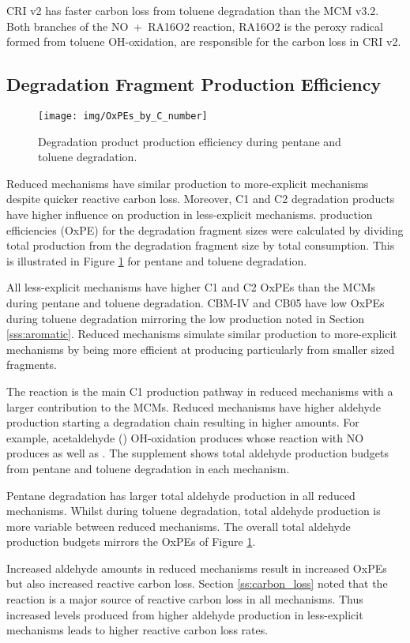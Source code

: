 CRI v2 has faster carbon loss from toluene degradation than the MCM v3.2.
Both branches of the \mbox{NO + RA16O2} reaction, RA16O2 is the peroxy radical formed from toluene OH-oxidation, are responsible for the carbon loss in CRI v2.

\subsection[Degradation Fragment Ox Production Efficiency]{Degradation Fragment  Production Efficiency} \label{ss:OxPE}

\begin{figure}
    \centering
    \texttt{[image: img/OxPEs\_by\_C\_number]}
    \vspace{0mm}
    \caption{Degradation product  production efficiency during pentane and toluene degradation.}
    \vspace{-4mm}
    \label{f:OxPE}
\end{figure}

Reduced mechanisms have similar  production to more-explicit mechanisms despite quicker reactive carbon loss.
Moreover, C1 and C2 degradation products have higher influence on  production in less-explicit mechanisms.
 production efficiencies (OxPE) for the degradation fragment sizes were calculated by dividing total  production from the degradation fragment size by total  consumption.
This is illustrated in Figure \ref{f:OxPE} for pentane and toluene degradation.

All less-explicit mechanisms have higher C1 and C2 OxPEs than the MCMs during pentane and toluene degradation.
CBM-IV and CB05 have low OxPEs during toluene degradation mirroring the low  production noted in Section \ref{sss:aromatic}.
Reduced mechanisms simulate similar  production to more-explicit mechanisms by being more efficient at producing  particularly from smaller sized fragments.

The  reaction is the main C1  production pathway in reduced mechanisms with a larger contribution to the MCMs.
Reduced mechanisms have higher aldehyde production starting a degradation chain resulting in higher  amounts.
For example, acetaldehyde () OH-oxidation produces  whose reaction with NO produces  as well as .
The supplement shows total aldehyde production budgets from pentane and toluene degradation in each mechanism.  

Pentane degradation has larger total aldehyde production in all reduced mechanisms.
Whilst during toluene degradation, total aldehyde production is more variable between reduced mechanisms.
The overall total aldehyde production budgets mirrors the OxPEs of Figure \ref{f:OxPE}.

Increased aldehyde amounts in reduced mechanisms result in increased OxPEs but also increased reactive carbon loss.
Section \ref{ss:carbon_loss} noted that the  reaction is a major source of reactive carbon loss in all mechanisms. 
Thus increased  levels produced from higher aldehyde production in less-explicit mechanisms leads to higher reactive carbon loss rates.

